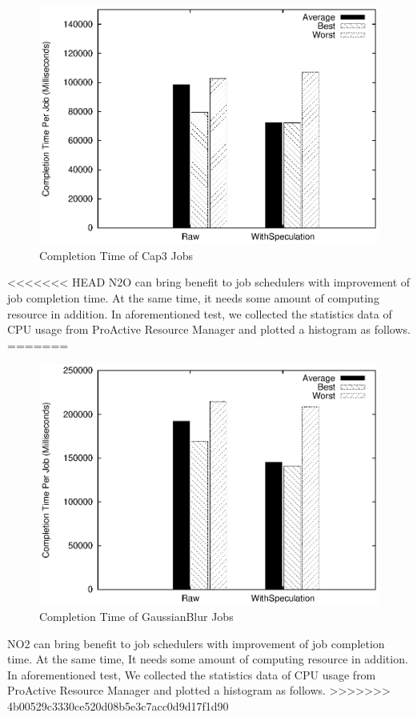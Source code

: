 \begin{figure}
\centering
\includegraphics[width=0.9\columnwidth]{figures/completiontime_cap3.eps}
\caption{Completion Time of Cap3 Jobs}
\label{figure:completiontime_cap3}
\end{figure}

<<<<<<< HEAD
N2O can bring benefit to job schedulers with improvement of job completion time. At the same time, it needs some amount of computing resource in addition. In aforementioned test, we collected the statistics data of CPU usage from ProActive Resource Manager and plotted a histogram as follows.
=======
\begin{figure}
\centering
\includegraphics[width=0.9\columnwidth]{figures/completiontime_gaussianblur.eps}
\caption{Completion Time of GaussianBlur Jobs}
\label{figure:completiontime_gaussianblur}
\end{figure}

NO2 can bring benefit to job schedulers with improvement of job completion time. At the same time, It needs some amount of computing resource in addition. In aforementioned test, We collected the statistics data of CPU usage from ProActive Resource Manager and plotted a histogram as follows.
>>>>>>> 4b00529c3330ce520d08b5e3c7acc0d9d17f1d90

